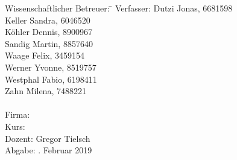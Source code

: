 \begin{titlepage}
\begin{center}
\begin{minipage}{\textwidth}
\begin{tabbing}
	Wissenschaftlicher Betreuer: \hspace{0.35cm}\=\kill
	Verfasser: 
		\> Dutzi Jonas, 6681598 \\
		\> Keller Sandra, 6046520 \\
		\> Köhler Dennis, 8900967 \\
		\> Sandig Martin, 8857640 \\
		\> Waage Felix, 3459154 \\
		\> Werner Yvonne, 8519757 \\
		\> Westphal Fabio, 6198411 \\
		\> Zahn Milena, 7488221 \\\\
	Firma: \> \DerNameDerFirma  \\[1.5mm]
	Kurs: \> \DieKursbezeichnung \\[1.5mm]
	Dozent: \> Gregor Tielsch \\[1.5mm]
	Abgabe: . Februar 2019
\end{tabbing}
\end{minipage}

\end{center}

\end{titlepage}